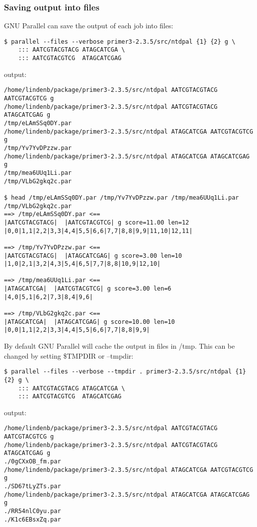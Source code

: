 \documentclass{article}
\begin{document}
\subsubsection{Saving output into files}
GNU Parallel can save the output of each job into files:
\begin{lstlisting}
$ parallel --files --verbose primer3-2.3.5/src/ntdpal {1} {2} g \
	::: AATCGTACGTACG ATAGCATCGA \
	::: AATCGTACGTCG  ATAGCATCGAG
\end{lstlisting}
output:
\begin{lstlisting}
/home/lindenb/package/primer3-2.3.5/src/ntdpal AATCGTACGTACG AATCGTACGTCG g
/home/lindenb/package/primer3-2.3.5/src/ntdpal AATCGTACGTACG ATAGCATCGAG g
/tmp/eLAmSSq0DY.par
/home/lindenb/package/primer3-2.3.5/src/ntdpal ATAGCATCGA AATCGTACGTCG g
/tmp/Yv7YvDPzzw.par
/home/lindenb/package/primer3-2.3.5/src/ntdpal ATAGCATCGA ATAGCATCGAG g
/tmp/mea6UUq1Li.par
/tmp/VLbG2gkq2c.par

$ head /tmp/eLAmSSq0DY.par /tmp/Yv7YvDPzzw.par /tmp/mea6UUq1Li.par /tmp/VLbG2gkq2c.par
==> /tmp/eLAmSSq0DY.par <==
|AATCGTACGTACG|  |AATCGTACGTCG| g score=11.00 len=12 |0,0|1,1|2,2|3,3|4,4|5,5|6,6|7,7|8,8|9,9|11,10|12,11|

==> /tmp/Yv7YvDPzzw.par <==
|AATCGTACGTACG|  |ATAGCATCGAG| g score=3.00 len=10 |1,0|2,1|3,2|4,3|5,4|6,5|7,7|8,8|10,9|12,10|

==> /tmp/mea6UUq1Li.par <==
|ATAGCATCGA|  |AATCGTACGTCG| g score=3.00 len=6 |4,0|5,1|6,2|7,3|8,4|9,6|

==> /tmp/VLbG2gkq2c.par <==
|ATAGCATCGA|  |ATAGCATCGAG| g score=10.00 len=10 |0,0|1,1|2,2|3,3|4,4|5,5|6,6|7,7|8,8|9,9|
\end{lstlisting}

By default GNU Parallel will cache the output in files in /tmp. This can be changed by setting \$TMPDIR or --tmpdir:
\begin{lstlisting}
$ parallel --files --verbose --tmpdir . primer3-2.3.5/src/ntdpal {1} {2} g \
	::: AATCGTACGTACG ATAGCATCGA \
	::: AATCGTACGTCG  ATAGCATCGAG
\end{lstlisting}
output:
\begin{lstlisting}
/home/lindenb/package/primer3-2.3.5/src/ntdpal AATCGTACGTACG AATCGTACGTCG g
/home/lindenb/package/primer3-2.3.5/src/ntdpal AATCGTACGTACG ATAGCATCGAG g
./0gCXxOB_fm.par
/home/lindenb/package/primer3-2.3.5/src/ntdpal ATAGCATCGA AATCGTACGTCG g
./SD67tLyZTs.par
/home/lindenb/package/primer3-2.3.5/src/ntdpal ATAGCATCGA ATAGCATCGAG g
./RR54nlC0yu.par
./K1c6EBsxZq.par
\end{lstlisting}
\end{document}
